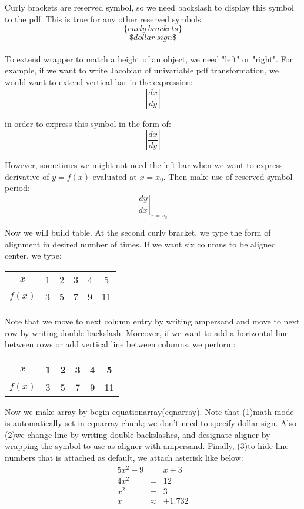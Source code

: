 \documentclass[11pt]{article}
\begin{document}
Curly brackets are reserved symbol, so we need backslash to display this symbol to
the pdf. This is true for any other reserved symbols.
$$\{curly\ brackets\}$$
$$\$dollar\ sign\$$$\\

To extend wrapper to match a height of an object, we need "left" or "right". For
example, if we want to write Jacobian of univariable pdf transformation, we would
want to extend vertical bar in the expression:
$$|\frac{dx}{dy}|$$

in order to express this symbol in the form of:
$$\left| \frac{dx}{dy} \right|$$

However, sometimes we might not need the left bar when we want to express derivative of
$y=f(x)$ evaluated at $x=x_{0}$. Then make use of reserved symbol period:
$$\left. \frac{dy}{dx} \right|_{x=x_{0}}$$

Now we will build table. At the second curly bracket, we type the form of alignment 
in desired number of times. If we want six columns to be aligned center, we type:
\begin{tabular}{cccccc}
$x$ & 1 & 2 & 3 & 4 & 5 \\
$f(x)$ & 3 & 5 & 7 & 9 & 11
\end{tabular}

Note that we move to next column entry by writing ampersand and move to next row
by writing double backslash. Moreover, if we want to add a horizontal line between
rows or add vertical line between columns, we perform:
\begin{tabular}{|c|ccccc|}
\hline
$x$ & 1 & 2 & 3 & 4 & 5 \\ \hline
$f(x)$ & 3 & 5 & 7 & 9 & 11 \\ \hline
\end{tabular}

Now we make array by begin equationarray(eqnarray). Note that (1)math mode is
automatically set in eqnarray chunk; we don't need to specify dollar sign. Also
(2)we change line by writing double backslashes, and designate aligner by wrapping
the symbol to use as aligner with ampersand. Finally, (3)to hide line numbers that
is attached as default, we attach asterisk like below:
\begin{eqnarray*}
5x^2-9&=&x+3\\
4x^2&=&12\\
x^2&=&3\\
x&\approx&\pm1.732
\end{eqnarray*}
\end{document}
